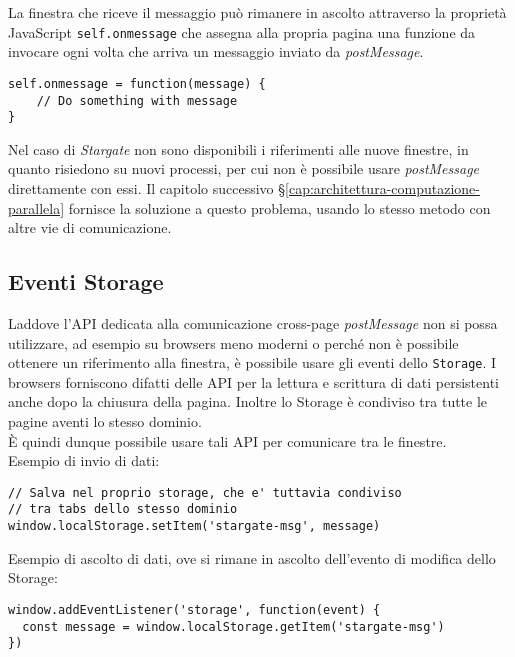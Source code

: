 La finestra che riceve il messaggio può rimanere in ascolto attraverso la proprietà JavaScript \texttt{self.onmessage} che assegna alla propria pagina una funzione da invocare ogni volta che arriva un messaggio inviato da \textit{postMessage}. \\

\vfill

\begin{lstlisting}[language={[Sharp]C},basicstyle=\footnotesize]
self.onmessage = function(message) {
    // Do something with message
}
\end{lstlisting}

Nel caso di \textit{Stargate} non sono disponibili i riferimenti alle nuove finestre, in quanto risiedono su nuovi processi, per cui non è possibile usare \textit{postMessage} direttamente con essi. Il capitolo successivo §\ref{cap:architettura-computazione-parallela} fornisce la soluzione a questo problema, usando lo stesso metodo con altre vie di comunicazione.

\subsection{Eventi Storage}

Laddove l'API dedicata alla comunicazione cross-page \textit{postMessage} non si possa utilizzare, ad esempio su browsers meno moderni o perché non è possibile ottenere un riferimento alla finestra, è possibile usare gli eventi dello \texttt{Storage}. I browsers forniscono difatti delle API per la lettura e scrittura di dati persistenti anche dopo la chiusura della pagina. Inoltre lo Storage è condiviso tra tutte le pagine aventi lo stesso dominio. \\

È quindi dunque possibile usare tali API per comunicare tra le finestre. \\

Esempio di invio di dati:

\begin{lstlisting}[language={[Sharp]C},basicstyle=\footnotesize]
// Salva nel proprio storage, che e' tuttavia condiviso
// tra tabs dello stesso dominio
window.localStorage.setItem('stargate-msg', message)
\end{lstlisting}

Esempio di ascolto di dati, ove si rimane in ascolto dell'evento di modifica dello Storage:

\begin{lstlisting}[language={[Sharp]C},basicstyle=\footnotesize]
window.addEventListener('storage', function(event) {
  const message = window.localStorage.getItem('stargate-msg')
})
\end{lstlisting}

